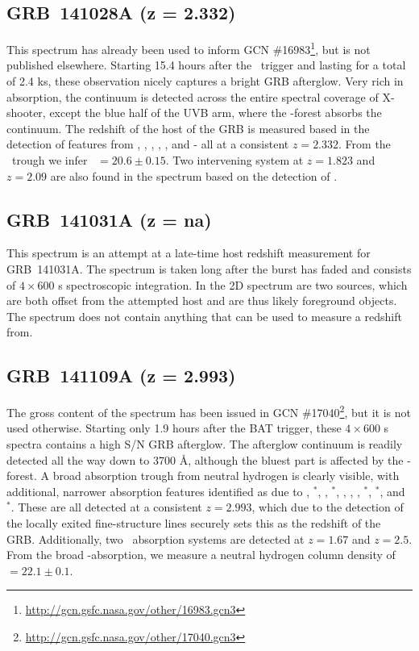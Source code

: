 \documentclass{aa}    %
\begin{document}
\subsection{GRB~141028A (z = 2.332)}	

This spectrum has already been used to inform GCN
\#16983\footnote{\url{http://gcn.gsfc.nasa.gov/other/16983.gcn3}}, but is not
published elsewhere. Starting 15.4 hours after the \swift~trigger and lasting
for a total of 2.4 ks, these observation nicely captures a bright GRB afterglow.
Very rich in absorption, the continuum is detected across the entire spectral
coverage of X-shooter, except the blue half of the UVB arm, where the
\lya-forest absorbs the continuum. The redshift of the host of the GRB is
measured based in the detection of features from \lya, \SIii, \civ, \cii, \feii,
and \mgii - all at a consistent $z = 2.332$. From the \lya~trough we infer
\nh~$=20.6 \pm 0.15$. Two intervening system at $z = 1.823$ and $z = 2.09$ are
also found in the spectrum based on the detection of \civ.

\subsection{GRB~141031A  (z = na)}	

This spectrum is an attempt at a late-time host redshift measurement for
GRB~141031A. The spectrum is taken long after the burst has faded and consists
of $4\times600$ s spectroscopic integration. In the 2D spectrum are two sources,
which are both offset from the attempted host and are thus likely foreground
objects. The spectrum does not contain anything that can be used to measure a
redshift from.

\subsection{GRB~141109A (z = 2.993)}	

The gross content of the spectrum has been issued in GCN
\#17040\footnote{\url{http://gcn.gsfc.nasa.gov/other/17040.gcn3}}, but it is not
used otherwise. Starting only 1.9 hours after the BAT trigger, these
$4\times600$ s spectra contains a high S/N GRB afterglow. The afterglow
continuum is readily detected all the way down to 3700 \AA, although the bluest
part is affected by the \lya-forest. A broad absorption trough from neutral
hydrogen is clearly visible, with additional, narrower absorption features
identified as due to \SIii, \SIii$^*$, \cii, \cii$^*$, \SIiv, \civ, \feii,
\feii$^*$, \oi$^*$, and \nii$^*$. These are all detected at a consistent $z =
2.993$, which due to the detection of the locally exited fine-structure lines
securely sets this as the redshift of the GRB. Additionally, two
\mgii~absorption systems are detected at $z = 1.67$ and $z=2.5$. From the broad
\lya-absorption, we measure a neutral hydrogen column density of \nh~$=22.1 \pm
0.1$.
\end{document}
